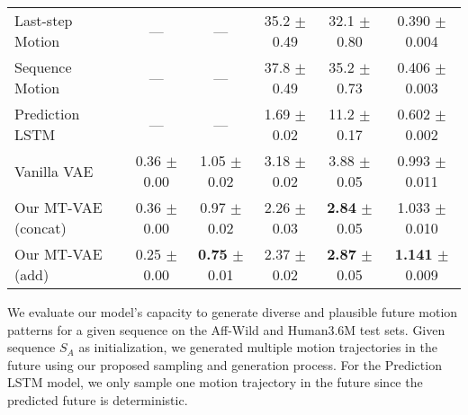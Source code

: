\documentclass[runningheads]{llncs}
\begin{document}
\begin{table}[t]
\begin{subtable}{1.0\textwidth}
\begin{tabular}{l||c|c||c|c||c}
\hline
Last-step Motion & --- & --- & 35.2 $\pm$ 0.49 & 32.1 $\pm$ 0.80 & 0.390 $\pm$ 0.004\\
Sequence Motion & --- & --- & 37.8 $\pm$ 0.49 & 35.2 $\pm$ 0.73 & 0.406 $\pm$ 0.003\\
Prediction LSTM~\cite{villegas2017learning} & --- & --- & 1.69 $\pm$ 0.02 & 11.2 $\pm$ 0.17 & 0.602 $\pm$ 0.002\\
Vanilla VAE~\cite{mohammad2018stochastic} & 0.36 $\pm$ 0.00 & 1.05 $\pm$ 0.02 & 3.18 $\pm$ 0.02 & 3.88 $\pm$ 0.05 & 0.993 $\pm$ 0.011\\
\hline
Our MT-VAE (concat) & 0.36 $\pm$ 0.00 & 0.97 $\pm$ 0.02 & 2.26 $\pm$ 0.03 & \textbf{2.84} $\pm$ 0.05 & 1.033 $\pm$ 0.010\\
Our MT-VAE (add) & 0.25 $\pm$ 0.00 & \textbf{0.75} $\pm$ 0.01 & 2.37 $\pm$ 0.02 & \textbf{2.87} $\pm$ 0.05 & \textbf{1.141} $\pm$ 0.009\\
\hline
\end{tabular}
\end{subtable}
\label{tab:table_seqgen}
\vspace*{-0.2in}
\end{table}

We evaluate our model's capacity to generate diverse and plausible future motion patterns for a given sequence on the Aff-Wild and Human3.6M test sets.
Given sequence $S_A$ as initialization, we generated multiple motion trajectories in the future using our proposed sampling and generation process.
For the Prediction LSTM model, we only sample one motion trajectory in the future since the predicted future is deterministic. 
\end{document}
